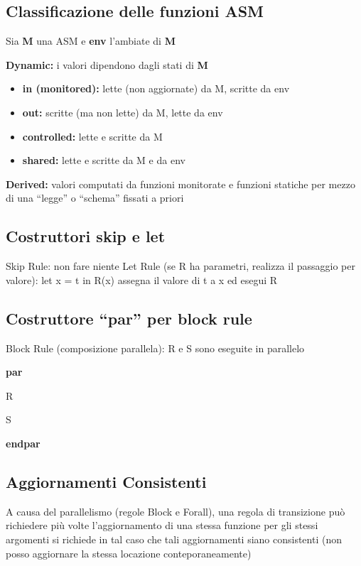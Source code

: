 \documentclass{article}
\begin{document}
 \subsection*{Classificazione delle funzioni ASM}
 Sia \textbf{M} una ASM e \textbf{env} l'ambiate di \textbf{M}

 \textbf{Dynamic:}  i valori dipendono dagli stati di \textbf{M}

 \begin{itemize}
     \item \textbf{in (monitored):} lette (non aggiornate) da M, scritte da env
      \item \textbf{out:} scritte (ma non lette) da M, lette da env
      \item \textbf{controlled:} lette e scritte da M
      \item \textbf{shared:} lette e scritte da M e da env 
 \end{itemize}

 \textbf{Derived:} valori computati da funzioni monitorate e funzioni statiche per mezzo di una “legge” o “schema” fissati a priori


\subsection*{Costruttori skip e let}
Skip Rule: non fare niente
Let Rule (se R ha parametri, realizza il passaggio per valore): let x = t in R(x) assegna il valore di t a x ed esegui R

\subsection*{Costruttore “par” per block rule}
Block Rule (composizione parallela): R e S sono eseguite in parallelo


 \textbf{par}

   \hspace{1cm} R

   \hspace{1cm} S

 \textbf{endpar}

\subsection*{Aggiornamenti Consistenti}
A causa del parallelismo (regole Block e Forall), una regola 
di transizione può richiedere più volte l’aggiornamento di una 
stessa funzione per gli stessi argomenti si richiede in tal caso che tali aggiornamenti siano 
consistenti (non posso aggiornare la stessa locazione conteporaneamente)
\end{document}
